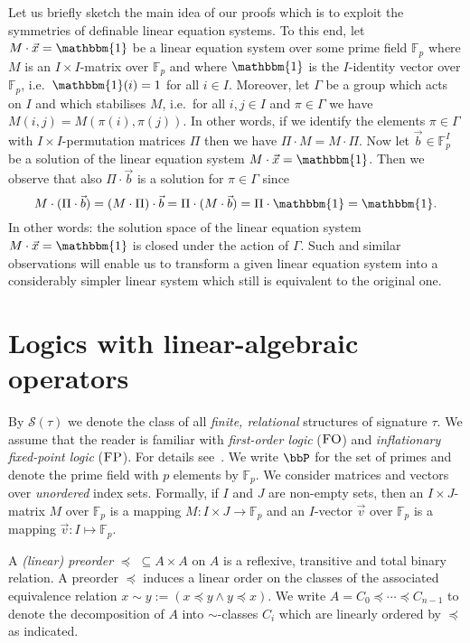 \documentclass[a4paper,UKenglish]{lipics}
\newcommand{\field}[1]{\mathbb{#1}}
\newcommand{\onevec}{\ensuremath{\mathbbm{1}}}
\newcommand{\Str}{\ensuremath{\mathscr{S}}}
\newcommand{\logic}[1]{\ensuremath{\textsc{#1}}\xspace}
\newcommand{\FO}{\logic{FO}}
\newcommand{\FP}{\logic{FP}}
\newcommand{\vct}[1]{\vec{#1}}
\theoremstyle{plain}
\begin{document}
\bigskip
Let us briefly sketch the main idea of our proofs which is to exploit the 
symmetries of definable linear equation systems. 
To this end, let $M \cdot \vct x = \onevec$ be a linear 
equation 
system over some prime field $\field F_p$ where $M$ is an $I \times 
I$-matrix over $\field F_p$ and where $\onevec$ is the $I$-identity vector over 
$\field F_p$, i.e.\ $\onevec(i) = 1$ for all $i \in I$.
Moreover, let $\Gamma$ be a group which acts on $I$ and which 
stabilises $M$, i.e.\ for all $i, j \in I$ and $\pi \in \Gamma$ we have 
$M(i,j) = M(\pi(i),\pi(j))$. 
In other words, if we identify the elements $\pi \in \Gamma$ with $I \times 
I$-permutation matrices $\Pi$ then we have $\Pi \cdot M = M \cdot \Pi$.
Now let $\vec b \in \field F_p^I$ be a solution of the linear 
equation system $M \cdot \vct x = \onevec$. Then we observe that also $\Pi 
\cdot \vct b$ is a solution for $\pi \in \Gamma$ since
\[ M \cdot (\Pi \cdot \vct b) = (M \cdot \Pi) \cdot \vct b = \Pi \cdot (M \cdot 
\vct b) = \Pi \cdot \onevec = \onevec.\]
In other words: the solution space of the linear equation system $M \cdot \vct 
x = \onevec$ is closed under the action of $\Gamma$.
Such and similar observations will enable us to transform a given 
linear equation system into a considerably simpler linear system which still is 
equivalent to the original one. 


\section{Logics with linear-algebraic operators}
\label{sec:logics:linalgop}

By $\Str(\tau)$ we denote the class of all \emph{finite, relational} structures 
of signature $\tau$.
We assume that the reader is familiar with \emph{first-order logic} ($\FO$) and 
\emph{inflationary fixed-point logic} ($\FP$). For details 
see~\cite{ebbinghaus99finite,FMTbook}.
We write $\bbP$ for the set of primes and denote the prime field with $p$ 
elements by $\field F_p$. 
We consider matrices and 
vectors over \emph{unordered} index sets. Formally, if 
$I$ and $J$ are non-empty sets, then an $I \times J$-matrix $M$ over $\field 
F_p$ is a mapping $M: I \times J \to \field F_p$ and an $I$-vector $\vct v$ 
over $\field F_p$ is a mapping $\vct v: I \mapsto \field F_p$.


A \emph{(linear) preorder} $\preceq \,\, \subseteq A\times A$ on $A$ is a 
reflexive, transitive and total binary relation. A preorder $\preceq$ induces a 
linear order on the classes of the associated equivalence relation $x \sim y := 
(x \preceq y \wedge y \preceq x)$. 
We write $A = C_0 \preceq \cdots \preceq C_{n-1}$ to denote the decomposition 
of $A$ into $\sim$-classes $C_i$ which are linearly ordered by $\preceq$ as 
indicated.
\end{document}
